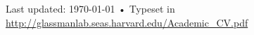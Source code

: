 \documentclass[10pt, a4paper]{article}
\begin{document}








 









\vfill{}

\begin{center}
{\scriptsize  Last updated: \today\- •\- 
Typeset in \href{http://nitens.org/taraborelli/cvtex}{
\XeTeX }\\
\href{http://glassmanlab.seas.harvard.edu/Academic_CV.pdf}{http://glassmanlab.seas.harvard.edu/Academic\_CV.pdf}}
\end{center}
\end{document}
